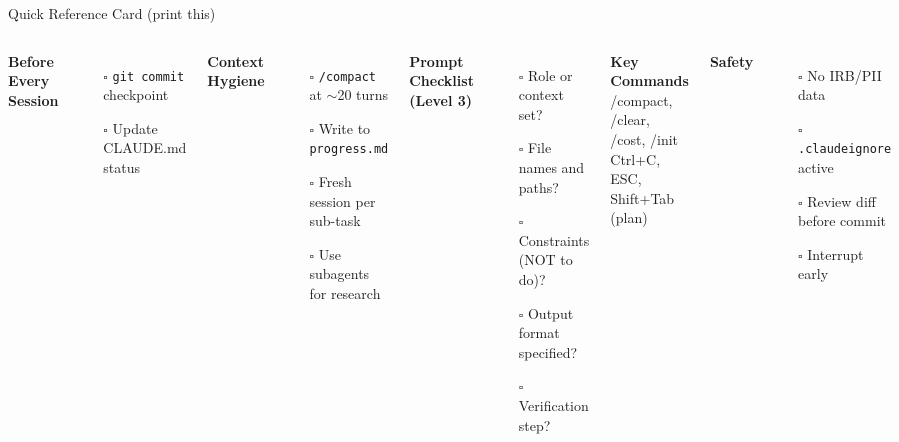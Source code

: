 \documentclass[aspectratio=169,10pt]{beamer}
\begin{document}
\begin{frame}{Quick Reference Card {\small(print this)}}
\small
\begin{columns}[T]
\textbf{\textcolor{uzhblue}{Before Every Session}}
\begin{itemize}\itemsep0pt
    \item[\scriptsize$\square$] \texttt{git commit} checkpoint
    \item[\scriptsize$\square$] Update CLAUDE.md status
\end{itemize}

\vspace{0.2em}
\textbf{\textcolor{uzhblue}{Context Hygiene}}
\begin{itemize}\itemsep0pt
    \item[\scriptsize$\square$] \texttt{/compact} at $\sim$20 turns
    \item[\scriptsize$\square$] Write to \texttt{progress.md}
    \item[\scriptsize$\square$] Fresh session per sub-task
    \item[\scriptsize$\square$] Use subagents for research
\end{itemize}

\textbf{\textcolor{uzhblue}{Prompt Checklist (Level 3)}}
\begin{itemize}\itemsep0pt
    \item[\scriptsize$\square$] Role or context set?
    \item[\scriptsize$\square$] File names and paths?
    \item[\scriptsize$\square$] Constraints (NOT to do)?
    \item[\scriptsize$\square$] Output format specified?
    \item[\scriptsize$\square$] Verification step?
\end{itemize}

\vspace{0.2em}
\textbf{\textcolor{uzhblue}{Key Commands}}\\
{\scriptsize\ttfamily
/compact, /clear, /cost, /init\\
Ctrl+C, ESC, Shift+Tab (plan)}

\textbf{\textcolor{uzhblue}{Safety}}
\begin{itemize}\itemsep0pt
    \item[\scriptsize$\square$] No IRB/PII data
    \item[\scriptsize$\square$] \texttt{.claudeignore} active
    \item[\scriptsize$\square$] Review diff before commit
    \item[\scriptsize$\square$] Interrupt early
\end{itemize}


\end{columns}
\end{frame}
\end{document}
